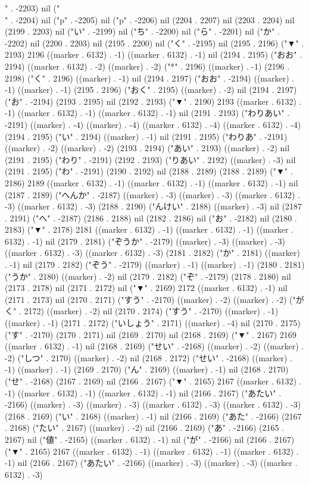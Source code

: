 " . -2203) nil ("\\" . -2204) nil ("p" . -2205) nil ("p" . -2206) nil (2204 . 2207) nil (2203 . 2204) nil (2199 . 2203) nil ("い" . -2199) nil ("ち" . -2200) nil ("ら" . -2201) nil ("か" . -2202) nil (2200 . 2203) nil (2195 . 2200) nil ("く" . -2195) nil (2195 . 2196) ("▼" . 2193) 2196 ((marker . 6132) . -1) ((marker . 6132) . -1) nil (2194 . 2195) ("おお" . 2194) ((marker . 6132) . -2) ((marker) . -2) ("*" . 2196) ((marker) . -1) (2196 . 2198) ("く" . 2196) ((marker) . -1) nil (2194 . 2197) ("おお" . -2194) ((marker) . -1) ((marker) . -1) (2195 . 2196) ("おく" . 2195) ((marker) . -2) nil (2194 . 2197) ("お" . -2194) (2193 . 2195) nil (2192 . 2193) ("▼" . 2190) 2193 ((marker . 6132) . -1) ((marker . 6132) . -1) ((marker . 6132) . -1) nil (2191 . 2193) ("わりあい" . -2191) ((marker) . -4) ((marker) . -4) ((marker . 6132) . -4) ((marker . 6132) . -4) (2194 . 2195) ("い" . 2194) ((marker) . -1) nil (2191 . 2195) ("わりあ" . -2191) ((marker) . -2) ((marker) . -2) (2193 . 2194) ("あい" . 2193) ((marker) . -2) nil (2191 . 2195) ("わり" . -2191) (2192 . 2193) ("りあい" . 2192) ((marker) . -3) nil (2191 . 2195) ("わ" . -2191) (2190 . 2192) nil (2188 . 2189) (2188 . 2189) ("▼" . 2186) 2189 ((marker . 6132) . -1) ((marker . 6132) . -1) ((marker . 6132) . -1) nil (2187 . 2189) ("へんか" . -2187) ((marker) . -3) ((marker) . -3) ((marker . 6132) . -3) ((marker . 6132) . -3) (2188 . 2190) ("んけい" . 2188) ((marker) . -3) nil (2187 . 2191) ("へ" . -2187) (2186 . 2188) nil (2182 . 2186) nil ("お" . -2182) nil (2180 . 2183) ("▼" . 2178) 2181 ((marker . 6132) . -1) ((marker . 6132) . -1) ((marker . 6132) . -1) nil (2179 . 2181) ("ぞうか" . -2179) ((marker) . -3) ((marker) . -3) ((marker . 6132) . -3) ((marker . 6132) . -3) (2181 . 2182) ("か" . 2181) ((marker) . -1) nil (2179 . 2182) ("ぞう" . -2179) ((marker) . -1) ((marker) . -1) (2180 . 2181) ("うか" . 2180) ((marker) . -2) nil (2179 . 2182) ("ぞ" . -2179) (2178 . 2180) nil (2173 . 2178) nil (2171 . 2172) nil ("▼" . 2169) 2172 ((marker . 6132) . -1) nil (2171 . 2173) nil (2170 . 2171) ("すう" . -2170) ((marker) . -2) ((marker) . -2) ("がく" . 2172) ((marker) . -2) nil (2170 . 2174) ("すう" . -2170) ((marker) . -1) ((marker) . -1) (2171 . 2172) ("いしょう" . 2171) ((marker) . -4) nil (2170 . 2175) ("す" . -2170) (2170 . 2171) nil (2169 . 2170) nil (2168 . 2169) ("▼" . 2167) 2169 ((marker . 6132) . -1) nil (2168 . 2169) ("せい" . -2168) ((marker) . -2) ((marker) . -2) ("しつ" . 2170) ((marker) . -2) nil (2168 . 2172) ("せい" . -2168) ((marker) . -1) ((marker) . -1) (2169 . 2170) ("ん" . 2169) ((marker) . -1) nil (2168 . 2170) ("せ" . -2168) (2167 . 2169) nil (2166 . 2167) ("▼" . 2165) 2167 ((marker . 6132) . -1) ((marker . 6132) . -1) ((marker . 6132) . -1) nil (2166 . 2167) ("あたい" . -2166) ((marker) . -3) ((marker) . -3) ((marker . 6132) . -3) ((marker . 6132) . -3) (2168 . 2169) ("い" . 2168) ((marker) . -1) nil (2166 . 2169) ("あた" . -2166) (2167 . 2168) ("たい" . 2167) ((marker) . -2) nil (2166 . 2169) ("あ" . -2166) (2165 . 2167) nil ("値" . -2165) ((marker . 6132) . -1) nil ("が" . -2166) nil (2166 . 2167) ("▼" . 2165) 2167 ((marker . 6132) . -1) ((marker . 6132) . -1) ((marker . 6132) . -1) nil (2166 . 2167) ("あたい" . -2166) ((marker) . -3) ((marker) . -3) ((marker . 6132) . -3) 